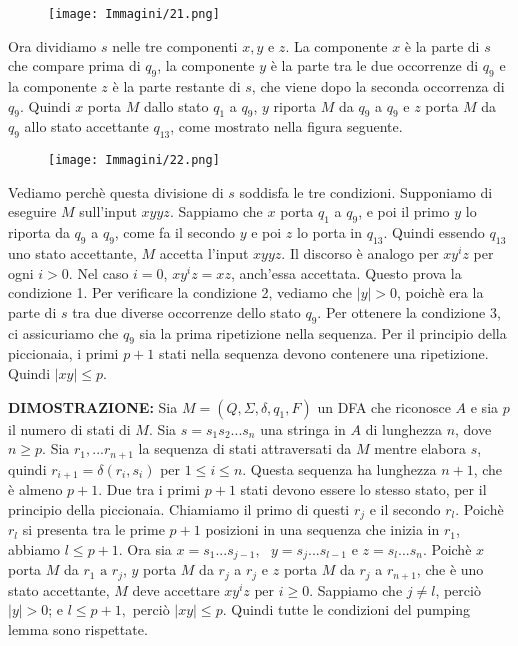 \documentclass{article}
\begin{document}
\begin{figure}[H]
    \centering
    \texttt{[image: Immagini/21.png]}
    \label{fig:your_image}
\end{figure}

Ora dividiamo $s$ nelle tre componenti $x,y$ e $z$. La componente $x$ è la
parte di $s$ che compare prima di $q_{9}$, la componente $y$ è la parte tra le due
occorrenze di $q_{9}$ e la componente $z$ è la parte restante di $s$, che viene dopo
la seconda occorrenza di $q_{9}$. Quindi $x$ porta $M$ dallo stato $q_{1}$ a $q_{9}$, $y$ riporta
$M$ da $q_{9}$ a $q_{9}$ e $z$ porta $M$ da $q_{9}$ allo stato accettante $q_{13}$, come mostrato
nella figura seguente.

\begin{figure}[H]
    \centering
    \texttt{[image: Immagini/22.png]}
    \label{fig:your_image}
\end{figure}

Vediamo perchè questa divisione di $s$ soddisfa le tre condizioni. Supponiamo di eseguire $M$ sull'input $xyyz$. Sappiamo che $x$ porta $q_{1}$ a $q_{9}$, e poi il primo $y$ lo riporta da $q_{9}$ a $q_{9}$, come fa il secondo $y$ e poi $z$ lo porta in $q_{13}$. Quindi essendo $q_{13}$ uno stato accettante, $M$ accetta l'input $xyyz$. Il discorso è analogo per $xy^{i}z$ per ogni $i>0$. Nel caso $i = 0$, $xy^{i}z=xz$, anch'essa accettata. Questo prova la condizione 1.
Per verificare la condizione 2, vediamo che $|y| > 0$, poichè era la parte di $s$ tra due diverse occorrenze dello stato $q_{9}$.
Per ottenere la condizione 3, ci assicuriamo che $q_{9}$ sia la prima ripetizione nella sequenza. Per il principio della piccionaia, i primi $p+1$ stati nella sequenza devono contenere una ripetizione. Quindi $|xy| \leq p$.
\vspace{1em}

\textbf{DIMOSTRAZIONE:}
Sia $M = (Q,\Sigma,\delta,q_{1},F)$ un DFA che riconosce $A$ e sia $p$ il numero di stati di $M$.
Sia $s = s_{1}s_{2}...s_{n}$ una stringa in $A$ di lunghezza $n$, dove $n \geq p$. Sia $r_{1},...r_{n+1}$ la sequenza di stati attraversati da $M$ mentre elabora $s$, quindi $r_{i+1} = \delta(r_{i},s_{i})$ per $1 \leq i \leq n$. Questa sequenza ha lunghezza $n+1$, che è almeno $p+1$. Due tra i primi $p+1$ stati devono essere lo stesso stato, per il principio della piccionaia. Chiamiamo il primo di questi $r_{j}$ e il secondo $r_{l}$. Poichè $r_{l}$ si presenta tra le prime $p+1$ posizioni in una sequenza che inizia in $r_{1}$, abbiamo $l \leq p+1$. Ora sia $x = s_{1}...s_{j-1},\text{ }y = s_{j}...s_{l-1}$ e $z = s_{l}...s_{n}$. Poichè $x$ porta $M$ da $r_{1} \text{ a }r_{j}$, $y$ porta $M$ da $r_{j}$ a $r_{j}$ e $z$ porta $M$ da $r_{j}$ a $r_{n+1}$, che è uno stato accettante, $M$ deve accettare $xy^{i}z \text{ per }i \geq 0$. Sappiamo che $j\neq l$, perciò $|y| > 0$; e $l \leq p+1,$ perciò $|xy| \leq p$. Quindi tutte le condizioni del pumping lemma sono rispettate.
\vspace{3em}
\end{document}
